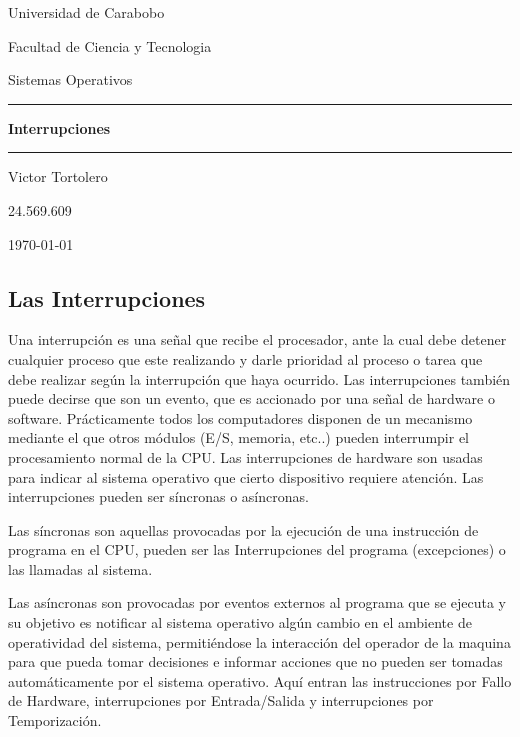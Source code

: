 \documentclass{article}
\begin{document}
\centerline{Universidad de Carabobo}
\centerline{Facultad de Ciencia y Tecnologia}
\centerline{Sistemas Operativos}

\vspace{8cm}
\begin{centering}
\hrule 	\vspace{0.4cm}
	{ \Huge \bfseries Interrupciones \\[0.4cm] }
\hrule \vfill
\end{centering}

\vfill
\centerline{Victor Tortolero}
\centerline{24.569.609}



\centerline{\today}

\newpage


\flushleft
\setlength{\parindent}{20pt}


	\justify
	\begin{centering} \section{Las Interrupciones} \end{centering}
	Una interrupción es una señal que recibe el procesador, ante la cual debe detener cualquier proceso que este realizando y darle prioridad al proceso o tarea que debe realizar según la interrupción que haya ocurrido. Las interrupciones también puede decirse que son un evento, que es accionado por una señal de hardware o software. 
	Prácticamente todos los computadores disponen de un mecanismo mediante el que otros módulos (E/S, memoria, etc..) pueden interrumpir el procesamiento normal de la CPU.
	Las interrupciones de hardware son usadas para indicar al sistema operativo que cierto dispositivo requiere atención.
	Las interrupciones pueden ser síncronas o asíncronas.

	Las síncronas son aquellas provocadas por la ejecución de una instrucción de programa en el CPU, pueden ser las Interrupciones del programa (excepciones) o las llamadas al sistema.
	
	Las asíncronas son provocadas por eventos externos al programa que se ejecuta y su objetivo es notificar al sistema operativo algún cambio en el ambiente de operatividad del sistema, permitiéndose la interacción del operador de la maquina para que pueda tomar decisiones e informar acciones que no pueden ser tomadas automáticamente por el sistema operativo.
	Aquí entran las instrucciones por Fallo de Hardware, interrupciones por Entrada/Salida y interrupciones por Temporización.
	
\end{document}

